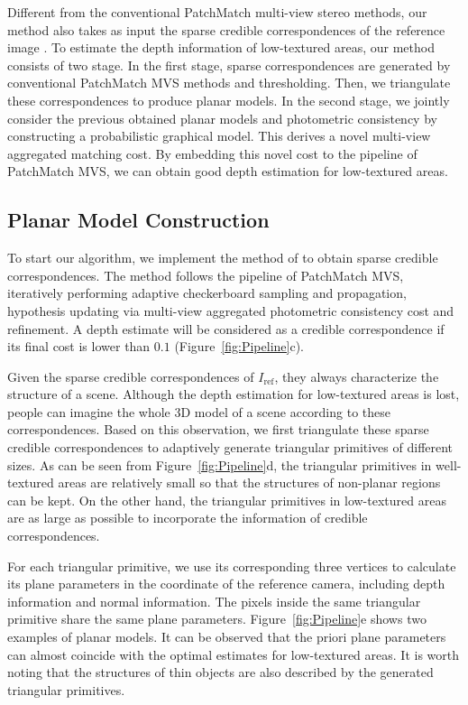 \documentclass[letterpaper]{article} %
\begin{document}
Different from the conventional PatchMatch multi-view stereo methods, our method also takes as input the sparse credible correspondences of the reference image . To estimate the depth information of low-textured areas, our method consists of two stage. In the first stage, sparse correspondences are generated by conventional PatchMatch MVS methods and thresholding. Then, we triangulate these correspondences to produce planar models. In the second stage, we jointly consider the previous obtained planar models and photometric consistency by constructing a probabilistic graphical model. This derives a novel multi-view aggregated matching cost. By embedding this novel cost to the pipeline of PatchMatch MVS, we can obtain good depth estimation for low-textured areas.

\subsection{Planar Model Construction}

To start our algorithm, we implement the method of \cite{Xu2018Multi} to obtain sparse credible correspondences. The method follows the pipeline of PatchMatch MVS, iteratively performing adaptive checkerboard sampling and propagation, hypothesis updating via multi-view aggregated photometric consistency cost and refinement. A depth estimate will be considered as a credible correspondence if its final cost is lower than $0.1$ (Figure~\ref{fig:Pipeline}c).

Given the sparse credible correspondences of $I_{\text{ref}}$, they always characterize the structure of a scene. Although the depth estimation for low-textured areas is lost, people can imagine the whole 3D model of a scene according to these correspondences. Based on this observation, we first triangulate these sparse credible correspondences to adaptively generate triangular primitives of different sizes. As can be seen from Figure~\ref{fig:Pipeline}d, the triangular primitives in well-textured areas are relatively small so that the structures of non-planar regions can be kept. On the other hand, the triangular primitives in low-textured areas are as large as possible to incorporate the information of credible correspondences.

For each triangular primitive, we use its corresponding three vertices to calculate its plane parameters in the coordinate of the reference camera, including depth information and normal information. The pixels inside the same triangular primitive share the same plane parameters. Figure~\ref{fig:Pipeline}e shows two examples of planar models. It can be observed that the priori plane parameters can almost coincide with the optimal estimates for low-textured areas. It is worth noting that the structures of thin objects are also described by the generated triangular primitives.
\end{document}

